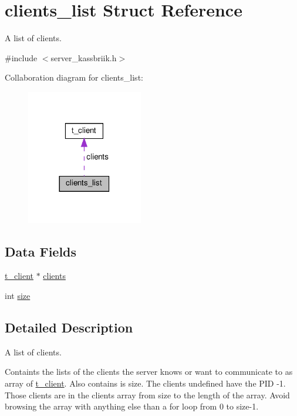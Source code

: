 \hypertarget{structclients__list}{}\section{clients\+\_\+list Struct Reference}
\label{structclients__list}


A list of clients.  




{\ttfamily \#include $<$server\+\_\+kassbriik.\+h$>$}



Collaboration diagram for clients\+\_\+list\+:\nopagebreak
\begin{figure}[H]
\begin{center}
\leavevmode
\includegraphics[width=144pt]{structclients__list__coll__graph}
\end{center}
\end{figure}
\subsection*{Data Fields}
\begin{DoxyCompactItemize}
\item 
\hyperlink{structt__client}{t\+\_\+client} $\ast$ \hyperlink{structclients__list_aebf714cf96a3647f8caa5c43c5af8ea7}{clients}
\item 
int \hyperlink{structclients__list_a439227feff9d7f55384e8780cfc2eb82}{size}
\end{DoxyCompactItemize}


\subsection{Detailed Description}
A list of clients. 

Containts the lists of the clients the server knows or want to communicate to as array of \hyperlink{structt__client}{t\+\_\+client}. Also contains is size. The clients undefined have the P\+ID -\/1. Those clients are in the client\textquotesingle{}s array from size to the length of the array. Avoid browsing the array with anything else than a for loop from 0 to size-\/1. 

